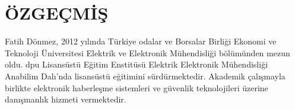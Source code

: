 \chapter*{ÖZGEÇMİŞ}
\thispagestyle{empty}


Fatih Dönmez, 2012 yılında Türkiye odalar ve Borsalar Birliği Ekonomi ve Teknoloji Üniversitesi Elektrik ve Elektronik Mühendisliği bölümünden mezun oldu. \gls{dpu} Lisansüstü Eğitim Enstitüsü Elektrik Elektronik Mühendisliği Anabilim Dalı'nda lisansüstü eğitimini sürdürmektedir.
Akademik çalışmayla birlikte elektronik haberleşme sistemleri ve güvenlik teknolojileri üzerine danışmanlık hizmeti vermektedir.
